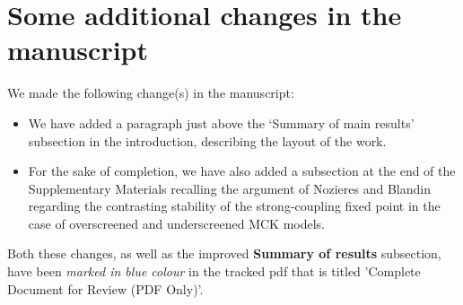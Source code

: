 \documentclass{article}
\begin{document}
\section*{Some additional changes in the manuscript}
We made the following change(s) in the manuscript:
\begin{itemize}
	\item We have added a paragraph just above the `Summary of main results' subsection in the introduction, describing the layout of the work.
	\item For the sake of completion, we have also added a subsection at the end of the Supplementary Materials recalling the argument of Nozieres and Blandin regarding the contrasting stability of the strong-coupling fixed point in the case of overscreened and underscreened MCK models.
\end{itemize}

Both these changes, as well as the improved {\bf Summary of results} subsection, have been {\it marked in blue colour} in the tracked pdf that is titled 'Complete Document for Review (PDF Only)'.



\end{document}
